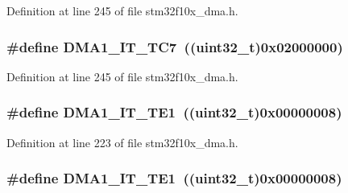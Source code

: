 Definition at line 245 of file stm32f10x\+\_\+dma.\+h.

\subsubsection[{\texorpdfstring{D\+M\+A1\+\_\+\+I\+T\+\_\+\+T\+C7}{DMA1_IT_TC7}}]{\setlength{\rightskip}{0pt plus 5cm}\#define D\+M\+A1\+\_\+\+I\+T\+\_\+\+T\+C7~(({\bf uint32\+\_\+t})0x02000000)}\hypertarget{group___d_m_a__interrupts__definition_ga17efb3180f536c295853e64e5ca508c2}{}\label{group___d_m_a__interrupts__definition_ga17efb3180f536c295853e64e5ca508c2}


Definition at line 245 of file stm32f10x\+\_\+dma.\+h.

\subsubsection[{\texorpdfstring{D\+M\+A1\+\_\+\+I\+T\+\_\+\+T\+E1}{DMA1_IT_TE1}}]{\setlength{\rightskip}{0pt plus 5cm}\#define D\+M\+A1\+\_\+\+I\+T\+\_\+\+T\+E1~(({\bf uint32\+\_\+t})0x00000008)}\hypertarget{group___d_m_a__interrupts__definition_ga0121b479efafe485719d14634a02d542}{}\label{group___d_m_a__interrupts__definition_ga0121b479efafe485719d14634a02d542}


Definition at line 223 of file stm32f10x\+\_\+dma.\+h.

\subsubsection[{\texorpdfstring{D\+M\+A1\+\_\+\+I\+T\+\_\+\+T\+E1}{DMA1_IT_TE1}}]{\setlength{\rightskip}{0pt plus 5cm}\#define D\+M\+A1\+\_\+\+I\+T\+\_\+\+T\+E1~(({\bf uint32\+\_\+t})0x00000008)}\hypertarget{group___d_m_a__interrupts__definition_ga0121b479efafe485719d14634a02d542}{}\label{group___d_m_a__interrupts__definition_ga0121b479efafe485719d14634a02d542}


